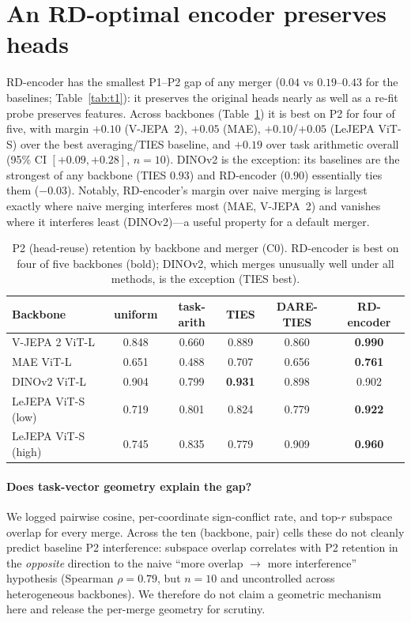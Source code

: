 \documentclass{article}
\begin{document}
\section{An RD-optimal encoder preserves heads}
RD-encoder has the smallest P1--P2 gap of any merger ($0.04$ vs $0.19$--$0.43$
for the baselines; Table~\ref{tab:t1}): it preserves the original heads nearly
as well as a re-fit probe preserves features. Across backbones
(Table~\ref{tab:t2}) it is best on P2 for four of five, with margin $+0.10$
(V-JEPA~2), $+0.05$ (MAE), $+0.10$/$+0.05$ (LeJEPA ViT-S) over the best
averaging/TIES baseline, and $+0.19$ over task arithmetic overall (95\% CI
$[+0.09,+0.28]$, $n{=}10$). DINOv2 is the exception: its baselines are the
strongest of any backbone (TIES $0.93$) and RD-encoder ($0.90$) essentially
ties them ($-0.03$). Notably, RD-encoder's margin over naive merging is
largest exactly where naive merging interferes most (MAE, V-JEPA~2) and
vanishes where it interferes least (DINOv2)---a useful property for a default
merger.

\begin{table}[t]\centering
\caption{P2 (head-reuse) retention by backbone and merger (C0). RD-encoder is
best on four of five backbones (bold); DINOv2, which merges unusually well
under all methods, is the exception (TIES best).}
\label{tab:t2}
\begin{tabular}{lccccc}\toprule
Backbone & uniform & task-arith & TIES & DARE-TIES & RD-encoder \\\midrule
V-JEPA 2 ViT-L        & 0.848 & 0.660 & 0.889 & 0.860 & \textbf{0.990} \\
MAE ViT-L             & 0.651 & 0.488 & 0.707 & 0.656 & \textbf{0.761} \\
DINOv2 ViT-L          & 0.904 & 0.799 & \textbf{0.931} & 0.898 & 0.902 \\
LeJEPA ViT-S (low)    & 0.719 & 0.801 & 0.824 & 0.779 & \textbf{0.922} \\
LeJEPA ViT-S (high)   & 0.745 & 0.835 & 0.779 & 0.909 & \textbf{0.960} \\\bottomrule
\end{tabular}
\end{table}

\paragraph{Does task-vector geometry explain the gap?} We logged pairwise
cosine, per-coordinate sign-conflict rate, and top-$r$ subspace overlap for
every merge. Across the ten (backbone, pair) cells these do not cleanly
predict baseline P2 interference: subspace overlap correlates with P2
retention in the \emph{opposite} direction to the naive ``more overlap $\to$
more interference'' hypothesis (Spearman $\rho=0.79$, but $n=10$ and
uncontrolled across heterogeneous backbones). We therefore do not claim a
geometric mechanism here and release the per-merge geometry for scrutiny.
\end{document}
